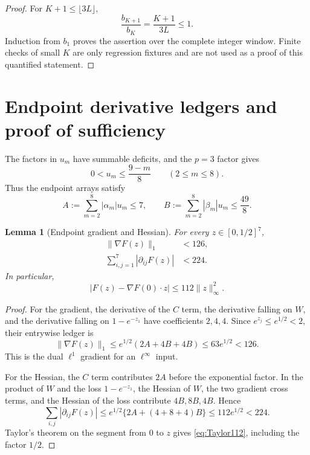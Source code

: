 \documentclass[11pt]{article}
\newtheorem{lemma}[theorem]{Lemma}
\theoremstyle{definition}
\theoremstyle{remark}
\begin{document}
\begin{proof}
For $K+1\le\lfloor3L\rfloor$,
\[
 \frac{b_{K+1}}{b_K}=\frac{K+1}{3L}\le1.
\]
Induction from $b_1$ proves the assertion over the complete integer
window.  Finite checks of small $K$ are only regression fixtures and are
not used as a proof of this quantified statement.
\end{proof}

\section{Endpoint derivative ledgers and proof of sufficiency}

The factors in $u_m$ have summable deficits, and the $p=3$ factor gives
\begin{equation}
 0<u_m\le\frac{9-m}{8}\qquad(2\le m\le8).
 \label{eq:u-bound}
\end{equation}
Thus the endpoint arrays satisfy
\begin{equation}
 A:=\sum_{m=2}^8|\alpha_m|u_m\le7,\qquad
 B:=\sum_{m=2}^8|\beta_m|u_m\le\frac{49}{8}.
 \label{eq:AB}
\end{equation}

\begin{lemma}[Endpoint gradient and Hessian]
\label{lem:endpoint-derivatives}
For every $z\in[0,1/2]^7$,
\begin{align}
 \|\nabla F(z)\|_1&<126,
 \label{eq:gradient126}\\
 \sum_{i,j=1}^7|\partial_{ij}F(z)|&<224.
 \label{eq:Hessian224}
\end{align}
In particular,
\begin{equation}
 |F(z)-\nabla F(0)\mathbin{\cdot}z|
 \le112\|z\|_\infty^2.
 \label{eq:Taylor112}
\end{equation}
\end{lemma}

\begin{proof}
For the gradient, the derivative of the $C$ term, the derivative falling
on $W$, and the derivative falling on $1-e^{-z_1}$ have coefficients
$2,4,4$.  Since $e^{z_j}\le e^{1/2}<2$, their entrywise ledger is
\[
 \|\nabla F(z)\|_1
 \le e^{1/2}(2A+4B+4B)
 \le63e^{1/2}<126.
\]
This is the dual $\ell^1$ gradient for an $\ell^\infty$ input.

For the Hessian, the $C$ term contributes $2A$ before the exponential
factor.  In the product of $W$ and the loss $1-e^{-z_1}$, the Hessian of
$W$, the two gradient cross terms, and the Hessian of the loss contribute
$4B,8B,4B$.  Hence
\[
 \sum_{i,j}|\partial_{ij}F(z)|
 \le e^{1/2}\{2A+(4+8+4)B\}
 \le112e^{1/2}<224.
\]
Taylor's theorem on the segment from $0$ to $z$ gives
\eqref{eq:Taylor112}, including the factor $1/2$.
\end{proof}
\end{document}
